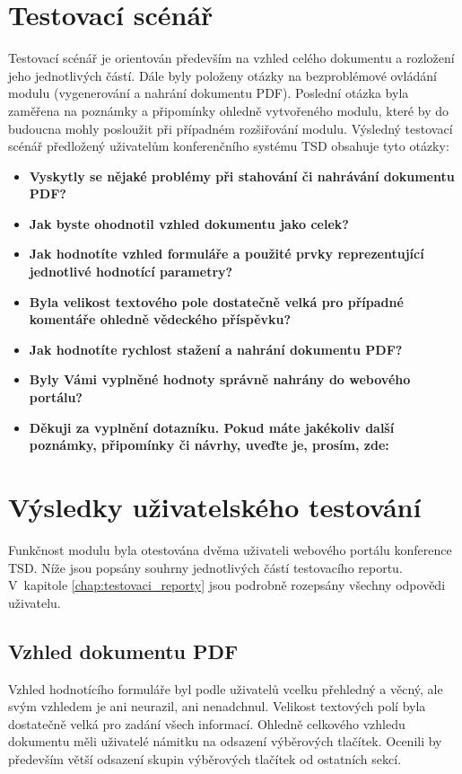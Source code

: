 \section{Testovací scénář}
Testovací scénář je orientován především na vzhled celého dokumentu a rozložení jeho jednotlivých částí. Dále byly položeny otázky na bezproblémové ovládání modulu (vygenerování a nahrání dokumentu PDF). Poslední otázka byla zaměřena na poznámky a připomínky ohledně vytvořeného modulu, které by do budoucna mohly posloužit při případném rozšiřování modulu.
Výsledný testovací scénář předložený uživatelům konferenčního systému TSD obsahuje tyto otázky:
\begin{itemize}
	\item \textbf{Vyskytly se nějaké problémy při stahování či nahrávání dokumentu PDF?}
	\item \textbf{Jak byste ohodnotil vzhled dokumentu jako celek?}
	\item \textbf{Jak hodnotíte vzhled formuláře a použité prvky reprezentující jednotlivé hodnotící parametry?}
	\item \textbf{Byla velikost textového pole dostatečně velká pro případné komentáře ohledně vědeckého příspěvku?}
	\item \textbf{Jak hodnotíte rychlost stažení a nahrání dokumentu PDF?} 
	\item \textbf{Byly Vámi vyplněné hodnoty správně nahrány do webového portálu?}
	\item \textbf{Děkuji za vyplnění dotazníku. Pokud máte jakékoliv další poznámky, připomínky či návrhy, uveďte je, prosím, zde:}
\end{itemize}

\section{Výsledky uživatelského testování}
Funkčnost modulu byla otestována dvěma uživateli webového portálu konference TSD. Níže jsou popsány souhrny jednotlivých částí testovacího reportu. V~kapitole \ref{chap:testovaci_reporty} jsou podrobně rozepsány všechny odpovědi uživatelu.
\subsection{Vzhled dokumentu PDF}
Vzhled hodnotícího formuláře byl podle uživatelů vcelku přehledný a věcný, ale svým vzhledem je ani neurazil, ani nenadchnul. Velikost textových polí byla dostatečně velká pro zadání všech informací. Ohledně celkového vzhledu dokumentu měli uživatelé námitku na odsazení výběrových tlačítek. Ocenili by především větší odsazení skupin výběrových tlačítek od ostatních sekcí.
